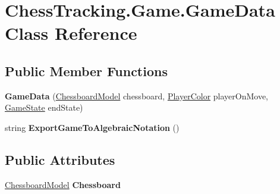 \hypertarget{class_chess_tracking_1_1_game_1_1_game_data}{}\section{Chess\+Tracking.\+Game.\+Game\+Data Class Reference}
\label{class_chess_tracking_1_1_game_1_1_game_data}
\subsection*{Public Member Functions}
\begin{DoxyCompactItemize}
\item 
\mbox{\label{class_chess_tracking_1_1_game_1_1_game_data_a5ce28bda0023355784dc18295130a943}} 
{\bfseries Game\+Data} (\mbox{\hyperlink{class_chess_tracking_1_1_game_1_1_chessboard_model}{Chessboard\+Model}} chessboard, \mbox{\hyperlink{namespace_chess_tracking_1_1_game_ab79070a55977a8c8326e9cdda7dcfa9a}{Player\+Color}} player\+On\+Move, \mbox{\hyperlink{namespace_chess_tracking_1_1_game_acd441ca4d0791bf4bf7fa8ec204a1ed7}{Game\+State}} end\+State)
\item 
\mbox{\label{class_chess_tracking_1_1_game_1_1_game_data_aa80110cd927b89624000acc9eea28797}} 
string {\bfseries Export\+Game\+To\+Algebraic\+Notation} ()
\end{DoxyCompactItemize}
\subsection*{Public Attributes}
\begin{DoxyCompactItemize}
\item 
\mbox{\label{class_chess_tracking_1_1_game_1_1_game_data_aa1bb8b412acf4523a7442c3a62b451b5}} 
\mbox{\hyperlink{class_chess_tracking_1_1_game_1_1_chessboard_model}{Chessboard\+Model}} {\bfseries Chessboard}
\end{DoxyCompactItemize}

